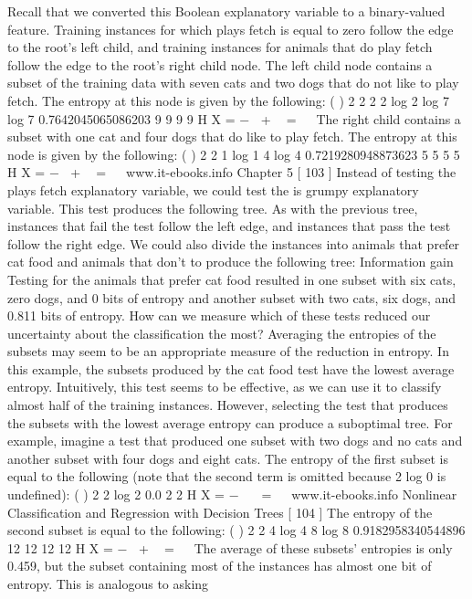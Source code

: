 Recall that we converted this Boolean explanatory variable to a binary-valued
feature. Training instances for which plays fetch is equal to zero follow the edge
to the root's left child, and training instances for animals that do play fetch follow
the edge to the root's right child node. The left child node contains a subset of the
training data with seven cats and two dogs that do not like to play fetch. The entropy
at this node is given by the following:
( ) 2 2 2
2 log 2 log 7 log 7 0.7642045065086203
9 9 9 9
H X = − +  =
 
The right child contains a subset with one cat and four dogs that do like to play fetch.
The entropy at this node is given by the following:
( ) 2 2
1 log 1 4 log 4 0.7219280948873623
5 5 5 5
H X = − +  =
 
www.it-ebooks.info
Chapter 5
[ 103 ]
Instead of testing the plays fetch explanatory variable, we could test the is
grumpy explanatory variable. This test produces the following tree. As with the
previous tree, instances that fail the test follow the left edge, and instances that
pass the test follow the right edge.
We could also divide the instances into animals that prefer cat food and animals that
don't to produce the following tree:
Information gain
Testing for the animals that prefer cat food resulted in one subset with six cats, zero
dogs, and 0 bits of entropy and another subset with two cats, six dogs, and 0.811
bits of entropy. How can we measure which of these tests reduced our uncertainty
about the classification the most? Averaging the entropies of the subsets may seem to
be an appropriate measure of the reduction in entropy. In this example, the subsets
produced by the cat food test have the lowest average entropy. Intuitively, this test
seems to be effective, as we can use it to classify almost half of the training instances.
However, selecting the test that produces the subsets with the lowest average
entropy can produce a suboptimal tree. For example, imagine a test that produced
one subset with two dogs and no cats and another subset with four dogs and eight
cats. The entropy of the first subset is equal to the following (note that the second
term is omitted because 2 log 0 is undefined):
( ) 2
2 log 2 0.0
2 2
H X = −  =
 
www.it-ebooks.info
Nonlinear Classification and Regression with Decision Trees
[ 104 ]
The entropy of the second subset is equal to the following:
( ) 2 2
4 log 4 8 log 8 0.9182958340544896
12 12 12 12
H X = − +  =
 
The average of these subsets' entropies is only 0.459, but the subset containing
most of the instances has almost one bit of entropy. This is analogous to asking
